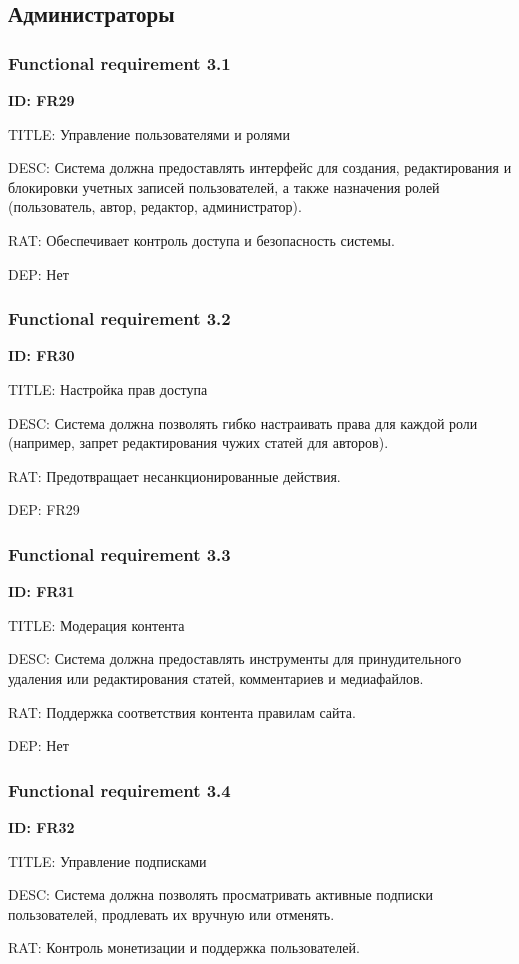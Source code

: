 \documentclass{scrreprt}
\begin{document}
\subsection{Администраторы}
\subsubsection{Functional requirement 3.1}
\textbf{ID: FR29}

TITLE: Управление пользователями и ролями

DESC: Система должна предоставлять интерфейс для создания, редактирования и блокировки учетных записей пользователей, а также назначения ролей (пользователь, автор, редактор, администратор).

RAT: Обеспечивает контроль доступа и безопасность системы.

DEP: Нет
\subsubsection{Functional requirement 3.2}
\textbf{ID: FR30}

TITLE: Настройка прав доступа

DESC: Система должна позволять гибко настраивать права для каждой роли (например, запрет редактирования чужих статей для авторов).

RAT: Предотвращает несанкционированные действия.

DEP: FR29
\subsubsection{Functional requirement 3.3}
\textbf{ID: FR31}

TITLE: Модерация контента

DESC: Система должна предоставлять инструменты для принудительного удаления или редактирования статей, комментариев и медиафайлов.

RAT: Поддержка соответствия контента правилам сайта.

DEP: Нет
\subsubsection{Functional requirement 3.4}
\textbf{ID: FR32}

TITLE: Управление подписками

DESC: Система должна позволять просматривать активные подписки пользователей, продлевать их вручную или отменять.

RAT: Контроль монетизации и поддержка пользователей.
\end{document}
